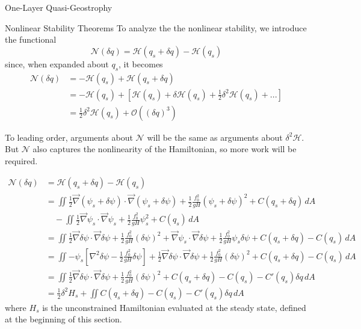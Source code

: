 \documentclass[12pt]{article}
\begin{document}
\begin{section}{One-Layer Quasi-Geostrophy}
    \begin{subsection}{Nonlinear Stability Theorems}
        To analyze the the nonlinear stability, we introduce the functional
        $$
        \mathcal{N}(\delta q)  = \mathcal{H}(q_s + \delta q) - \mathcal{H}(q_s)
        $$
        since, when expanded about $q_s$, it becomes
        \begin{align*}
            \mathcal{N}(\delta q)
            &= - \mathcal{H}(q_s) + \mathcal{H}(q_s + \delta q) \\
            & = - \mathcal{H}(q_s) + \left[ \mathcal{H}(q_s) + \delta \mathcal{H}(q_s)+ \frac12 \delta^2 \mathcal{H}(q_s) + ... \right] \\
            &= \frac12 \delta^2 \mathcal{H}(q_s) + \mathcal{O}((\delta q)^3)
        \end{align*}

        To leading order, arguments about $\mathcal{N}$ will be the same as arguments about $\delta^2 \mathcal{H}$. But $\mathcal{N}$ also captures the nonlinearity of the Hamiltonian, so more work will be required.

        \begin{align*}
            \mathcal{N}(\delta q)
            &= \mathcal{H}(q_s + \delta q) - \mathcal{H}(q_s) \\
            &= \iint  \frac12 \vec\nabla(\psi_s + \delta \psi) \cdot \vec\nabla(\psi_s + \delta \psi) + \frac12 \frac{f_0^2}{g H} (\psi_s + \delta \psi)^2 + C(q_s + \delta q) \, dA \\
            &\quad - \iint  \frac12 \vec\nabla\psi_s \cdot \vec\nabla\psi_s + \frac12 \frac{f_0^2}{g H} \psi_s^2 + C(q_s) \, dA \\
            &= \iint \frac12 \vec\nabla\delta\psi \cdot \vec\nabla\delta\psi + \frac12 \frac{f_0^2}{g H} (\delta \psi)^2 + \vec\nabla\psi_s \cdot \vec\nabla\delta\psi + \frac12 \frac{f_0^2}{g H} \psi_s\delta\psi + C(q_s + \delta q) - C(q_s) \, dA \\
            &= \iint -\psi_s \left[ \nabla^2\delta\psi - \frac12 \frac{f_0^2}{g H} \delta\psi \right] + \frac12 \vec\nabla\delta\psi \cdot \vec\nabla\delta\psi + \frac12 \frac{f_0^2}{g H}(\delta\psi)^2 + C(q_s + \delta q) - C(q_s) \, dA \\
            &= \iint \frac12 \vec\nabla\delta\psi \cdot \vec\nabla\delta\psi + \frac12 \frac{f_0^2}{g H}(\delta \psi)^2 + C(q_s + \delta q) - C(q_s) -C'(q_s)\delta q\, dA \\
            &= \frac12 \delta^2 H_s + \iint C(q_s + \delta q) - C(q_s) -C'(q_s)\delta q\, dA
        \end{align*}
        where $H_s$ is the unconstrained Hamiltonian evaluated at the steady state, defined at the beginning of this section.
    \end{subsection}
\end{section}
\end{document}
